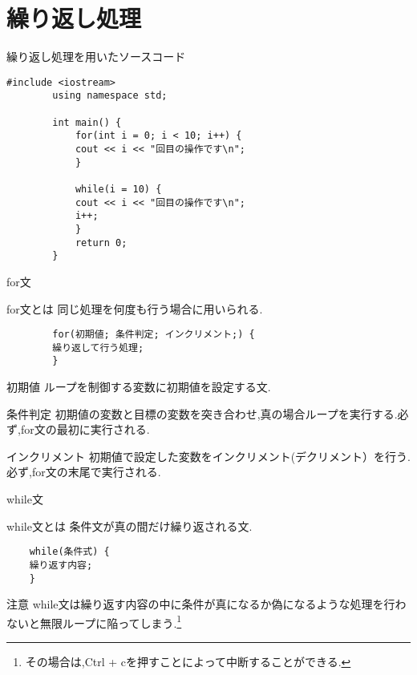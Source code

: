\documentclass[xdvipdfmx, 8pt, t]{beamer}
\begin{document}
\section{繰り返し処理}
\begin{frame}[fragile]{繰り返し処理を用いたソースコード}
    \begin{lstlisting}[caption=繰り返し処理を用いたコード]
        #include <iostream>
        using namespace std;

        int main() {
            for(int i = 0; i < 10; i++) {
            cout << i << "回目の操作です\n";
            }

            while(i = 10) {
            cout << i << "回目の操作です\n";
            i++;
            }
            return 0;
        }
    \end{lstlisting}
\end{frame}
\begin{frame}[fragile]{for文}
    \begin{block}{for文とは}
        同じ処理を何度も行う場合に用いられる.
    \end{block}
    \small
    \begin{lstlisting}
        for(初期値; 条件判定; インクリメント;) {
        繰り返して行う処理;
        }
    \end{lstlisting}
    \normal
    \begin{block}{初期値}
        ループを制御する変数に初期値を設定する文.
    \end{block}
    \begin{block}{条件判定}
        初期値の変数と目標の変数を突き合わせ,真の場合ループを実行する.必ず,for文の最初に実行される.
    \end{block}
    \begin{block}{インクリメント}
        初期値で設定した変数をインクリメント(デクリメント）を行う.必ず,for文の末尾で実行される.
    \end{block}
\end{frame}

\begin{frame}[fragile]{while文}
\begin{block}{while文とは}
    条件文が真の間だけ繰り返される文.
\end{block}
\begin{lstlisting}
    while(条件式) {
    繰り返す内容;
    }
\end{lstlisting}
\begin{alertblock}{注意}
    while文は繰り返す内容の中に条件が真になるか偽になるような処理を行わないと無限ループに陥ってしまう.\footnote{その場合は,Ctrl + cを押すことによって中断することができる.}
\end{alertblock}
\end{frame}
\end{document}
